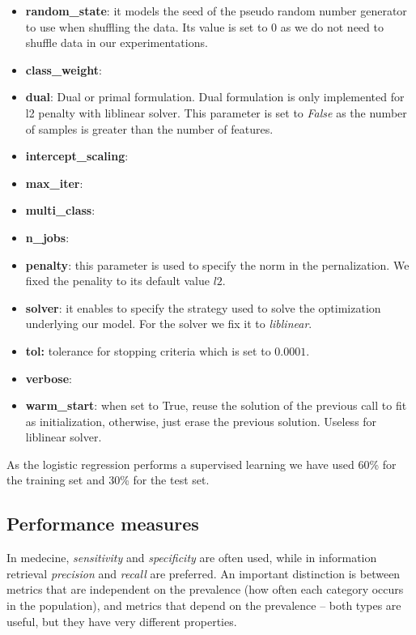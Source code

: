 \begin{itemize}
\item \textbf{random\_state}: it models the seed of the pseudo random number generator to use when shuffling the data. Its value
is set to $0$ as we do not need to shuffle data in our experimentations.
\item \textbf{class\_weight}:
\item \textbf{dual}: Dual or primal formulation. Dual formulation is only implemented for l2 penalty with liblinear solver.
This parameter is set to \emph{False} as the number of samples is greater than the number of features.
\item \textbf{intercept\_scaling}:
\item \textbf{max\_iter}:
\item \textbf{multi\_class}:
\item \textbf{n\_jobs}:
\item \textbf{penalty}: this parameter is used to specify the norm in the pernalization. We fixed the penality to its default value $l2$.
\item \textbf{solver}: it enables to specify the strategy used to solve the optimization underlying our model. For the solver we fix it 
to \emph{liblinear}.
\item \textbf{tol:} tolerance for stopping criteria which is set to $0.0001$.
\item \textbf{verbose}:
\item \textbf{warm\_start}: when set to True, reuse the solution of the previous call to fit as initialization, otherwise, just erase the
 previous solution. Useless for liblinear solver.
\end{itemize}

As the logistic regression performs a supervised learning we have used 60\% for the training set and 30\% for the test set.

\subsection{Performance measures}
In medecine, \emph{sensitivity} and \emph{specificity} are often used, 
while in information retrieval \emph{precision} and \emph{recall} are preferred.
An important distinction is between metrics that are independent on the prevalence
(how often each category occurs in the population), and metrics that depend on the
prevalence – both types are useful, but they have very different properties.


